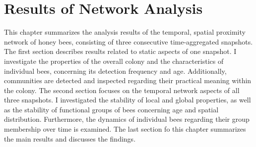 \chapter{Results of Network Analysis}
\label{ch:results}
This chapter summarizes the analysis results of the temporal, spatial proximity network of honey bees, consisting of three consecutive time-aggregated snapshots.
The first section describes results related to static aspects of one snapshot.
I investigate the properties of the overall colony and the characteristics of individual bees, concerning its detection frequency and age.
Additionally, communities are detected and inspected regarding their practical meaning within the colony.
The second section focuses on the temporal network aspects of all three snapshots.
I investigated the stability of local and global properties, as well as the stability of functional groups of bees concerning age and spatial distribution. Furthermore, the dynamics of individual bees regarding their group membership over time is examined.
The last section fo this chapter summarizes the main results and discusses the findings.



